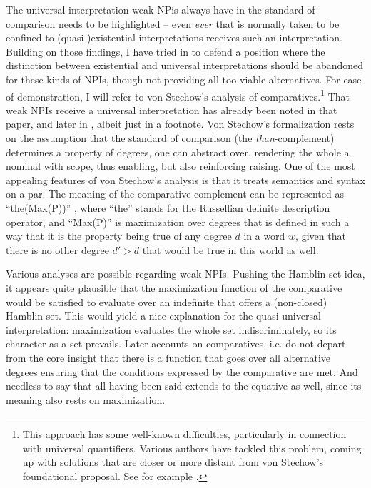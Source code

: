 \documentclass[output=paper,colorlinks,citecolor=brown,
]{langscibook}
\begin{document}
The universal interpretation weak NPis always have in the standard of comparison needs to be highlighted -- even
\textit{ever} that is normally taken to be confined to (quasi-)existential interpretations receives such an interpretation. Building on those findings,
I have tried in \citet{neubarth2017} to defend a position where the distinction between existential and universal
interpretations should be abandoned for these kinds of NPIs, though not providing all too viable alternatives.
For ease of demonstration, I will refer to von Stechow's \citeyearpar{stechow1984} analysis of
comparatives.\footnote{This approach has some well-known difficulties, particularly in connection with universal quantifiers. Various authors have
tackled this problem, coming up with solutions that are closer or more distant from von Stechow's foundational proposal.
See for example \citet{schwarzschwilk2002,heim2006,beck2010,fleisher2016}.}
That weak NPIs receive a universal interpretation has already been noted in that paper, and later in
\citet{schwarzschwilk2002}, albeit just in a footnote. Von Stechow's formalization rests on the assumption that the standard
of comparison (the \textit{than}-complement) determines a property of degrees, one can abstract over, rendering the
whole a nominal with scope, thus enabling, but also reinforcing raising. One of the most appealing features of von
Stechow's analysis is that it treats semantics and syntax on a par. The meaning of the comparative complement can be
represented as ``the(Max(P))'' \citep[55]{stechow1984}, where “the” stands for the Russellian definite description
operator, and “Max(P)” is maximization over degrees that is defined in such a way that it is the property being true of
any degree $d$ in a word $w$, given that there is no other degree $d' > d$ that would be true in this world as well.

Various analyses are possible regarding weak NPIs. Pushing the Hamblin-set idea, it appears quite plausible that the maximization function
of the comparative would be satisfied to evaluate over an indefinite that offers a (non-closed) Hamblin-set. This would yield a
nice explanation for the quasi-universal interpretation: maximization
evaluates the whole set indiscriminately, so its character as a set prevails. Later accounts on comparatives, i.e.
\citet{stechow1996,heim2000} do not depart from the core insight that there is a function that goes over all
alternative degrees ensuring that the conditions expressed by the comparative are met. And needless to say that all
having been said extends to the equative as well, since its meaning also rests on maximization.
\end{document}
